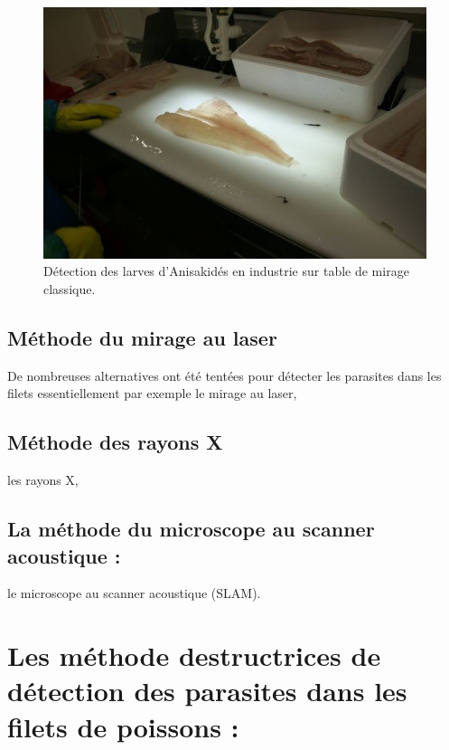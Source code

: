 \documentclass[12pt,a4paper]{article}
\begin{document}
\begin{figure}[!h]
   \center
   \includegraphics[scale=0.5]{Table_mirage.png}
   \caption {Détection des larves d'Anisakidés en industrie sur table de mirage classique.}
\end{figure}

\subsection{Méthode du mirage au laser}

De nombreuses alternatives ont été tentées pour détecter les parasites dans les filets  essentiellement  par exemple le mirage au laser,
\subsection{Méthode des rayons X}
 les rayons X,


\subsection{La méthode du  microscope au scanner acoustique :}
le microscope au scanner acoustique (SLAM).


\newpage
\section {Les  méthode destructrices de détection des parasites dans les filets de poissons :}
\end{document}
